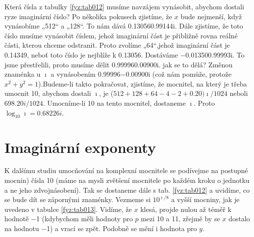     Která čísla z tabulky \ref{fyz:tab012} musíme navzájem vynásobit, abychom dostali ryze
    imaginární číslo? Po několika pokusech zjistíme, že \(x\) bude nejmenší, když vynásobíme
    „\num{512}“ a „\num{128}“. To nám dává \num{0.13056+0.99144i}. Dále zjistíme, že toto číslo
    musíme vynásobit číslem, jehož imaginární část je přibližně rovna reálné části, kterou chceme
    odstranit. Proto zvolíme „\num{64}“,jehož imaginární část je \num{0.14349}, neboť toto číslo je
    nejblíže k \num{0.13056}. Dostáváme \num{-0.01350+0.99993i}. To jsme přestřelili, proto musíme
    dělit \num{0.99996+0.00900i}. jak se to dělá? Změnou znaménka u \(\imath\) a vynásobením
    \num{0.99996-0.00900i} (což nám pomůže, protože \(x^2 + y^2 =1\)).Budeme-li takto pokračovat,
    zjistíme, že mocnitel, na který je třeba umocnit \num{10}, abychom dostali \(\imath\), je
    (\(\num{512}+\num{128}+\num{64}-\num{4}-\num{2}+\num{0.20})\imath/1024\) neboli
    \(\num{698.20i}/1024\). Umocníme-li \num{10} na tento mocnitel, dostaneme \(\imath\). Proto
    \(\log_{10}\imath = \num{0.68226i}\).

  \section{Imaginární exponenty}\label{fyz:IchapXXIIsecVI}
    K dalšímu studiu umocňování na komplexní mocnitele se podívejme na postupné mocnin) čísla
    \num{10} (máme na mysli zvětšení mocnitele po každém kroku o jednotku a ne jeho zdvojnásobení).
    Tak se dostaneme dále s tab. \ref {fyz:tab012} a uvidíme, co se bude dít se zápornými znaménky.
    Vezmeme si \(10^{\imath/8}\) a vyšší mocniny, jak je uvedeno v tabulce \ref {fyz:tab013}.
    Vidíme, že \(x\) klesá, projde nulou až téměř k hodnotě \num{-1} (kdybychom měli hodnoty pro
    \(p\) mezi \num{10} a \num{11}, zřejmě by se \(x\) dostalo na hodnotu \num{-1}) a vrací se zpět.
    Podobně se mění i hodnota pro \(y\).

